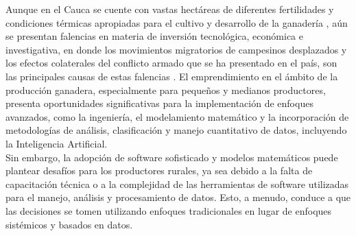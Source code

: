 Aunque en el Cauca se cuente con vastas hectáreas de diferentes fertilidades y condiciones térmicas apropiadas para el cultivo y desarrollo de la ganadería \cite{igac}, aún se presentan falencias en materia de inversión tecnológica, económica e investigativa, en donde los movimientos migratorios de campesinos desplazados y los efectos colaterales del conflicto armado que se ha presentado en el país, son las principales causas de estas falencias \cite{fao}. El emprendimiento en el ámbito de la producción ganadera, especialmente para pequeños y medianos productores, presenta oportunidades significativas para la implementación de enfoques avanzados, como la ingeniería, el modelamiento matemático y la incorporación de metodologías de análisis, clasificación y manejo cuantitativo de datos, incluyendo la Inteligencia Artificial.\\

Sin embargo, la adopción de software sofisticado y modelos matemáticos puede plantear desafíos para los productores rurales, ya sea debido a la falta de capacitación técnica o a la complejidad de las herramientas de software utilizadas para el manejo, análisis y procesamiento de datos. Esto, a menudo, conduce a que las decisiones se tomen utilizando enfoques tradicionales en lugar de enfoques sistémicos y basados en datos.




